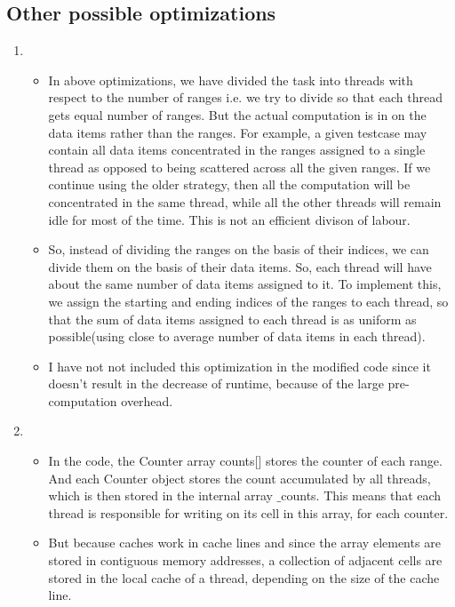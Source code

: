 \documentclass{article}
\begin{document}
    \subsection{Other possible optimizations}
    \begin{enumerate}
        \item 
        \begin{itemize}
            \item In above optimizations, we have divided the task into threads with respect to the number of ranges i.e. we try to divide so that each thread gets equal number of ranges. But the actual computation is in on the data items rather than the ranges. For example, a given testcase may contain all data items concentrated in the ranges assigned to a single thread as opposed to being scattered across all the given ranges. If we continue using the older strategy, then all the computation will be concentrated in the same thread, while all the other threads will remain idle for most of the time. This is not an efficient divison of labour. 
            
            \item So, instead of dividing the ranges on the basis of their indices, we can divide them on the basis of their data items. So, each thread will have about the same number of data items assigned to it. To implement this, we assign the starting and ending indices of the ranges to each thread, so that the sum of data items assigned to each thread is as uniform as possible(using close to average number of data items in each thread).
            
            \item I have not not included this optimization in the modified code since it doesn't result in the decrease of runtime, because of the large pre-computation overhead. 
        \end{itemize}   
        
        \item 
        \begin{itemize}
            \item 
            In the code, the Counter array counts[] stores the counter of each range. And each Counter object stores the count accumulated by all threads, which is then stored in the internal array $\_$counts. This means that each thread is responsible for writing on its cell in this array, for each counter. 
            
            \item But because caches work in cache lines and since the array elements are stored in contiguous memory addresses, a collection of adjacent cells are stored in the local cache of a thread, depending on the size of the cache line. 
            

\end{itemize}
\end{enumerate}
\end{document}
